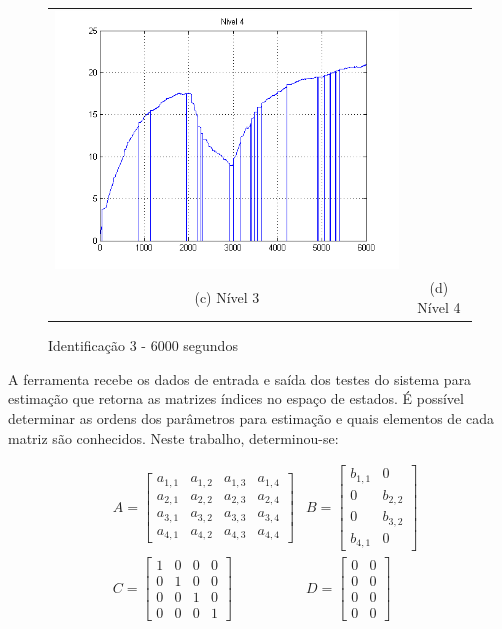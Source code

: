 \begin{figure}[H]
\begin{tabular}{cc}
		\includegraphics[height=0.15\paperheight,keepaspectratio]{img/sim3_h4.png} \\
		(c) Nível 3 &
		(d) Nível 4
	\end{tabular}
	\caption{\label{imgID_6000} Identificação 3 - 6000 segundos}
\end{figure}

A ferramenta recebe os dados de entrada e saída dos testes do sistema para estimação que retorna as matrizes índices no espaço de estados. É possível determinar as ordens dos parâmetros para estimação e quais elementos de cada matriz são conhecidos. Neste trabalho, determinou-se:

\begin{align}
	& A =
	\begin{bmatrix}
		a_{1,1} & a_{1,2} & a_{1,3} & a_{1,4} \\
		a_{2,1} & a_{2,2} & a_{2,3} & a_{2,4} \\
		a_{3,1} & a_{3,2} & a_{3,3} & a_{3,4} \\
		a_{4,1} & a_{4,2} & a_{4,3} & a_{4,4}
	\end{bmatrix}
	& B =
	\begin{bmatrix}
		b_{1,1} & 0 \\
		0 & b_{2,2} \\
		0 & b_{3,2} \\
		b_{4,1} & 0
	\end{bmatrix} \\
	& C  = 
	\begin{bmatrix}
		1 & 0 & 0 & 0 \\
		0 & 1 & 0 & 0 \\
		0 & 0 & 1 & 0 \\
		0 & 0 & 0 & 1
	\end{bmatrix} 
	& D  = 
	\begin{bmatrix}
		0 & 0 \\
		0 & 0 \\
		0 & 0 \\
		0 & 0
	\end{bmatrix}
\end{align}

